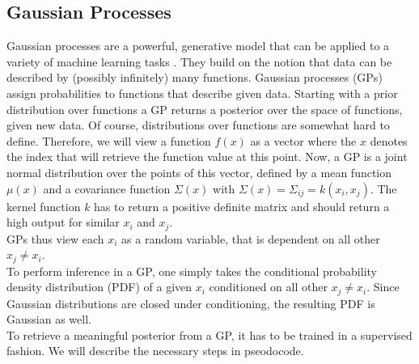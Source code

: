 \documentclass[a4paper,cleardoubleempty,BCOR1cm, 11pt]{report}
\begin{document}
\subsection{Gaussian Processes}\label{sec:gp}
Gaussian processes are a powerful, generative model that can be applied to a variety of machine learning tasks \cite{mackay1998introduction}. They build on the notion that data can be described by (possibly infinitely) many functions. Gaussian processes (GPs) assign probabilities to functions that describe given data. Starting with a prior distribution over functions a GP returns a posterior over the space of functions, given new data. Of course, distributions over functions are somewhat hard to define. Therefore, we will view a function $f(x)$ as a vector where the $x$ denotes the index that will retrieve the function value at this point. Now, a GP is a joint normal distribution over the points of this vector, defined by a mean function $\mu(x)$ and a covariance function $\Sigma(x)$ with $\Sigma(x) = \Sigma_{ij} = k(x_i,x_j)$. The kernel function $k$ has to return a positive definite matrix and should return a high output for similar $x_i$ and $x_j$.\\
GPs thus view each $x_i$ as a random variable, that is dependent on all other $x_j\neq x_i$.\\
To perform inference in a GP, one simply takes the conditional probability density distribution (PDF) of a given $x_i$ conditioned on all other $x_j\neq x_i$. Since Gaussian distributions are closed under conditioning, the resulting PDF is Gaussian as well.\\
To retrieve a meaningful posterior from a GP, it has to be trained in a supervised fashion. We will describe the necessary steps in pseodocode.
\end{document}
